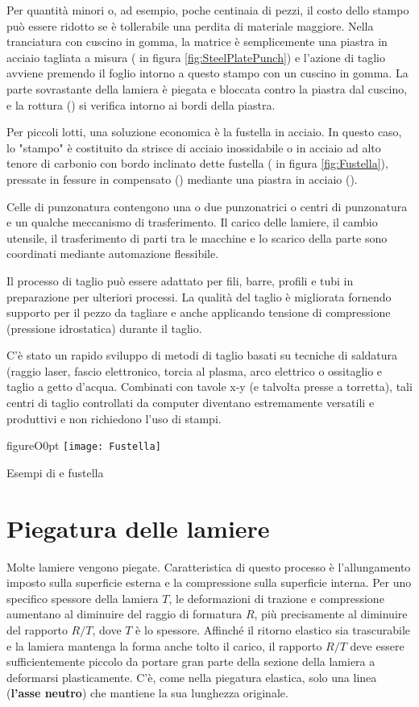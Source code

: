 Per quantità minori o, ad esempio, poche centinaia di pezzi, il costo dello stampo può essere ridotto se è tollerabile una perdita di materiale maggiore.
Nella tranciatura con cuscino in gomma, la matrice è semplicemente una piastra in acciaio tagliata a misura ( in figura \ref{fig:SteelPlatePunch}) e l'azione di taglio avviene premendo il foglio intorno a questo stampo con un cuscino in gomma. La parte sovrastante della lamiera è piegata e bloccata contro la piastra dal cuscino, e la rottura () si verifica intorno ai bordi della piastra.

Per piccoli lotti, una soluzione economica è la fustella in acciaio. In questo caso, lo "stampo" è costituito da strisce di acciaio inossidabile o in acciaio ad alto tenore di carbonio con bordo inclinato dette fustella ( in figura \ref{fig:Fustella}), pressate in fessure in compensato () mediante una piastra in acciaio ().

Celle di punzonatura contengono una o due punzonatrici o centri di punzonatura e un qualche meccanismo di trasferimento. Il carico delle lamiere, il cambio utensile, il trasferimento di parti tra le macchine e lo scarico della parte sono coordinati mediante automazione flessibile.

Il processo di taglio può essere adattato per fili, barre, profili e tubi in preparazione per ulteriori processi. La qualità del taglio è migliorata fornendo supporto per il pezzo da tagliare e anche applicando tensione di compressione (pressione idrostatica) durante il taglio.

C'è stato un rapido sviluppo di metodi di taglio basati su tecniche di saldatura (raggio laser, fascio elettronico, torcia al plasma, arco elettrico o ossitaglio e taglio a getto d'acqua. Combinati con tavole x-y (e talvolta presse a torretta), tali centri di taglio controllati da computer diventano estremamente versatili e produttivi e non richiedono l'uso di stampi.

\begin{wrapfloat}{figure}{O}{0pt}
\texttt{[image: Fustella]}
\caption{Esempi di  e fustella}
\label{fig:Fustella}
\end{wrapfloat}

\section{Piegatura delle lamiere}
Molte lamiere vengono piegate. Caratteristica di questo processo è l'allungamento imposto sulla superficie esterna e la compressione sulla superficie interna.
Per uno specifico spessore della lamiera $T$, le deformazioni di trazione e compressione aumentano al diminuire del raggio di formatura $R$, più precisamente al diminuire del rapporto $R/T$, dove $T$ è lo spessore.
Affinché il ritorno elastico sia trascurabile e la lamiera mantenga la forma anche tolto il carico, il rapporto $R/T$ deve essere sufficientemente piccolo da portare gran parte della sezione della lamiera a deformarsi plasticamente.
C'è, come nella piegatura elastica, solo una linea (\textbf{l'asse neutro}) che mantiene la sua lunghezza originale.


